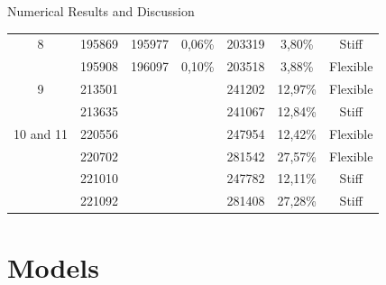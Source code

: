 \documentclass[8pt]{beamer}
\begin{document}
\begin{frame}{Numerical Results and Discussion}
\begin{table}[htbp]
{\begin{tabular}{||c|c|cc|cc|c||}
                    8     & 195869 & 195977 & 0,06\% & 203319 & 3,80\% & Stiff \\
                          & 195908 & 196097 & 0,10\% & 203518 & 3,88\% & Flexible \\
                    9     & 213501 &       &       & 241202 & 12,97\% & Flexible \\
                          & 213635 &       &       & 241067 & 12,84\% & Stiff \\
              {10 and 11} & 220556 &       &       & 247954 & 12,42\% & Flexible \\
                          & 220702 &       &       & 281542 & 27,57\% & Flexible \\
                          & 221010 &       &       & 247782 & 12,11\% & Stiff \\
                          & 221092 &       &       & 281408 & 27,28\% & Stiff \\
                    \hline
                \end{tabular}%
            }
            \end{table}%
        \end{frame}  

\section{Models}
\end{document}
